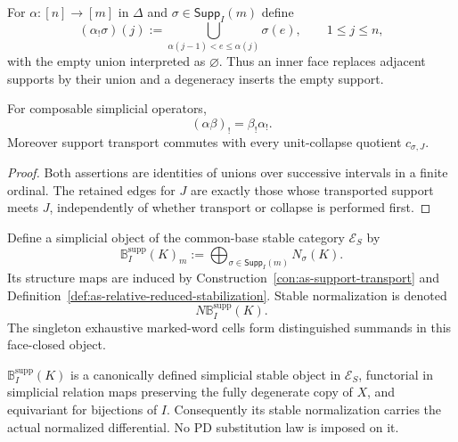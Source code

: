 \begin{construction}
\label{con:as-support-transport}
For $\alpha:[n]\to[m]$ in $\Delta$ and
$\sigma\in\mathsf{Supp}_I(m)$ define
\[
    (\alpha_!\sigma)(j)
    :=
    \bigcup_{\alpha(j-1)<e\leq\alpha(j)}\sigma(e),
    \qquad 1\leq j\leq n,
\]
with the empty union interpreted as $\varnothing$.  Thus an inner face replaces
adjacent supports by their union and a degeneracy inserts the empty support.
\end{construction}

\begin{lemma}
\label{lem:as-support-functoriality}
For composable simplicial operators,
\[
    (\alpha\beta)_!=\beta_!\alpha_!.
\]
Moreover support transport commutes with every unit-collapse quotient
$c_{\sigma,J}$.
\end{lemma}

\begin{proof}
Both assertions are identities of unions over successive intervals in a finite
ordinal.  The retained edges for $J$ are exactly those whose transported
support meets $J$, independently of whether transport or collapse is performed
first.
\end{proof}

\begin{definition}
\label{def:as-support-marked-cech}
Define a simplicial object of the common-base stable category $\mathcal E_S$ by
\[
\boxed{
    \mathbb B_I^{\mathrm{supp}}(K)_m
    :=
    \bigoplus_{\sigma\in\mathsf{Supp}_I(m)}N_\sigma(K).}
\]
Its structure maps are induced by
Construction~\ref{con:as-support-transport} and
Definition~\ref{def:as-relative-reduced-stabilization}.  Stable normalization
is denoted
\[
    N\mathbb B_I^{\mathrm{supp}}(K).
\]
The singleton exhaustive marked-word cells form distinguished summands in this
face-closed object.
\end{definition}

\begin{proposition}
\label{prop:as-support-marked-simplicial}
$\mathbb B_I^{\mathrm{supp}}(K)$ is a canonically defined simplicial stable
object in $\mathcal E_S$, functorial in simplicial relation maps preserving the
fully degenerate copy of $X$, and equivariant for bijections of $I$.
Consequently its stable normalization carries the actual normalized
differential.  No PD substitution law is imposed on it.
\end{proposition}

